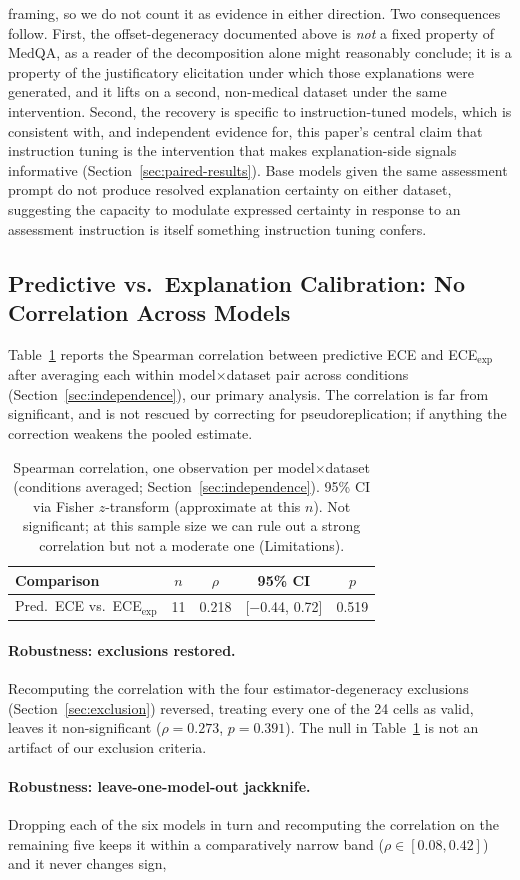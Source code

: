 \documentclass[letterpaper]{article} %
\begin{document}
framing, so we do not count it as evidence in either direction. Two consequences follow. First, the offset-degeneracy documented above is \emph{not} a fixed property of MedQA, as a reader of the decomposition alone might reasonably conclude; it is a property of the justificatory elicitation under which those explanations were generated, and it lifts on a second, non-medical dataset under the same intervention. Second, the recovery is specific to instruction-tuned models, which is consistent with, and independent evidence for, this paper's central claim that instruction tuning is the intervention that makes explanation-side signals informative (Section~\ref{sec:paired-results}). Base models given the same assessment prompt do not produce resolved explanation certainty on either dataset, suggesting the capacity to modulate expressed certainty in response to an assessment instruction is itself something instruction tuning confers. \subsection{Predictive vs.\ Explanation Calibration: No Correlation Across Models} Table~\ref{tab:correlations} reports the Spearman correlation between predictive ECE and ECE$_{\text{exp}}$ after averaging each within model$\times$dataset pair across conditions (Section~\ref{sec:independence}), our primary analysis. The correlation is far from significant, and is not rescued by correcting for pseudoreplication; if anything the correction weakens the pooled estimate. \begin{table}[h] \centering \small \begin{tabular}{lcccc} \toprule Comparison & $n$ & $\rho$ & 95\% CI & $p$ \\ \midrule Pred.\ ECE vs.\ ECE$_{\text{exp}}$ & 11 & 0.218 & [$-$0.44, 0.72] & 0.519 \\ \bottomrule \end{tabular} \caption{Spearman correlation, one observation per model$\times$dataset (conditions averaged; Section~\ref{sec:independence}). 95\% CI via Fisher $z$-transform (approximate at this $n$). Not significant; at this sample size we can rule out a strong correlation but not a moderate one (Limitations).} \label{tab:correlations} \end{table} \paragraph{Robustness: exclusions restored.} Recomputing the correlation with the four estimator-degeneracy exclusions (Section~\ref{sec:exclusion}) reversed, treating every one of the 24 cells as valid, leaves it non-significant ($\rho{=}0.273$, $p{=}0.391$). The null in Table~\ref{tab:correlations} is not an artifact of our exclusion criteria. \paragraph{Robustness: leave-one-model-out jackknife.} Dropping each of the six models in turn and recomputing the correlation on the remaining five keeps it within a comparatively narrow band ($\rho \in [0.08, 0.42]$) and it never changes sign, 
\end{document}

